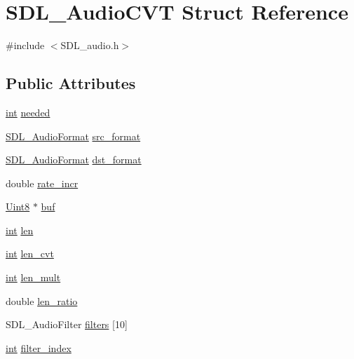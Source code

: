 \hypertarget{struct_s_d_l___audio_c_v_t}{}\section{S\+D\+L\+\_\+\+Audio\+C\+VT Struct Reference}
\label{struct_s_d_l___audio_c_v_t}


{\ttfamily \#include $<$S\+D\+L\+\_\+audio.\+h$>$}

\subsection*{Public Attributes}
\begin{DoxyCompactItemize}
\item 
\hyperlink{_s_d_l__thread_8h_a6a64f9be4433e4de6e2f2f548cf3c08e}{int} \hyperlink{struct_s_d_l___audio_c_v_t_ac600a035a48df05e14d3712fd6953ad4}{needed}
\item 
\hyperlink{_s_d_l__audio_8h_a491ed103fd25d920c4e6b7495217ce66}{S\+D\+L\+\_\+\+Audio\+Format} \hyperlink{struct_s_d_l___audio_c_v_t_a6ae81231e017105e6d5e745a51732e16}{src\+\_\+format}
\item 
\hyperlink{_s_d_l__audio_8h_a491ed103fd25d920c4e6b7495217ce66}{S\+D\+L\+\_\+\+Audio\+Format} \hyperlink{struct_s_d_l___audio_c_v_t_a8f890d017be857a3b048bf00525736c6}{dst\+\_\+format}
\item 
double \hyperlink{struct_s_d_l___audio_c_v_t_ad886122c23a6673073baace31bff3b6c}{rate\+\_\+incr}
\item 
\hyperlink{_s_d_l__stdinc_8h_a2944638813a090aa23e62f4da842c3e2}{Uint8} $\ast$ \hyperlink{struct_s_d_l___audio_c_v_t_a080db27b929efa983c5161360ffce310}{buf}
\item 
\hyperlink{_s_d_l__thread_8h_a6a64f9be4433e4de6e2f2f548cf3c08e}{int} \hyperlink{struct_s_d_l___audio_c_v_t_aeaeb8c5a63c3ab96471fbfdf412c78ff}{len}
\item 
\hyperlink{_s_d_l__thread_8h_a6a64f9be4433e4de6e2f2f548cf3c08e}{int} \hyperlink{struct_s_d_l___audio_c_v_t_a5c60163f34d1947e5b166c23aba9879d}{len\+\_\+cvt}
\item 
\hyperlink{_s_d_l__thread_8h_a6a64f9be4433e4de6e2f2f548cf3c08e}{int} \hyperlink{struct_s_d_l___audio_c_v_t_ac9662d47cf2348b82b27b151150116b0}{len\+\_\+mult}
\item 
double \hyperlink{struct_s_d_l___audio_c_v_t_a5628ff5ccf711de9d77c0a4a9f57d2f0}{len\+\_\+ratio}
\item 
S\+D\+L\+\_\+\+Audio\+Filter \hyperlink{struct_s_d_l___audio_c_v_t_aeec0ebddc5e142bbafcc94a6014ad23e}{filters} \mbox{[}10\mbox{]}
\item 
\hyperlink{_s_d_l__thread_8h_a6a64f9be4433e4de6e2f2f548cf3c08e}{int} \hyperlink{struct_s_d_l___audio_c_v_t_a35093b3ad3331c17416c593a76012b63}{filter\+\_\+index}
\end{DoxyCompactItemize}


